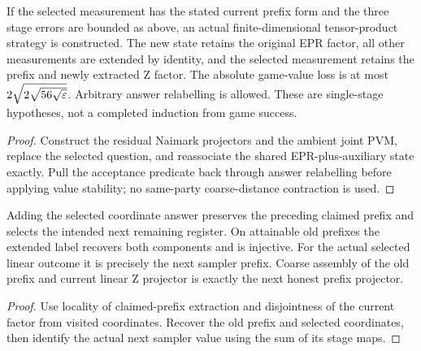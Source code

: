 \begin{lemma}
\label{lem:intro-adaptive-strategy}
\leanok
If the selected measurement has the stated current prefix form and the three stage errors are bounded as above, an actual finite-dimensional tensor-product strategy is constructed. The new state retains the original EPR factor, all other measurements are extended by identity, and the selected measurement retains the prefix and newly extracted Z factor. The absolute game-value loss is at most $2\sqrt{2\sqrt{56\sqrt{\varepsilon}}}$. Arbitrary answer relabelling is allowed. These are single-stage hypotheses, not a completed induction from game success.
\end{lemma}
\begin{proof}
\leanok
Construct the residual Naimark projectors and the ambient joint PVM, replace the selected question, and reassociate the shared EPR-plus-auxiliary state exactly. Pull the acceptance predicate back through answer relabelling before applying value stability; no same-party coarse-distance contraction is used.
\end{proof}

\begin{lemma}
\label{lem:intro-adaptive-advance}
\leanok
Adding the selected coordinate answer preserves the preceding claimed prefix and selects the intended next remaining register. On attainable old prefixes the extended label recovers both components and is injective. For the actual selected linear outcome it is precisely the next sampler prefix. Coarse assembly of the old prefix and current linear Z projector is exactly the next honest prefix projector.
\end{lemma}
\begin{proof}
\leanok
Use locality of claimed-prefix extraction and disjointness of the current factor from visited coordinates. Recover the old prefix and selected coordinates, then identify the actual next sampler value using the sum of its stage maps.
\end{proof}

